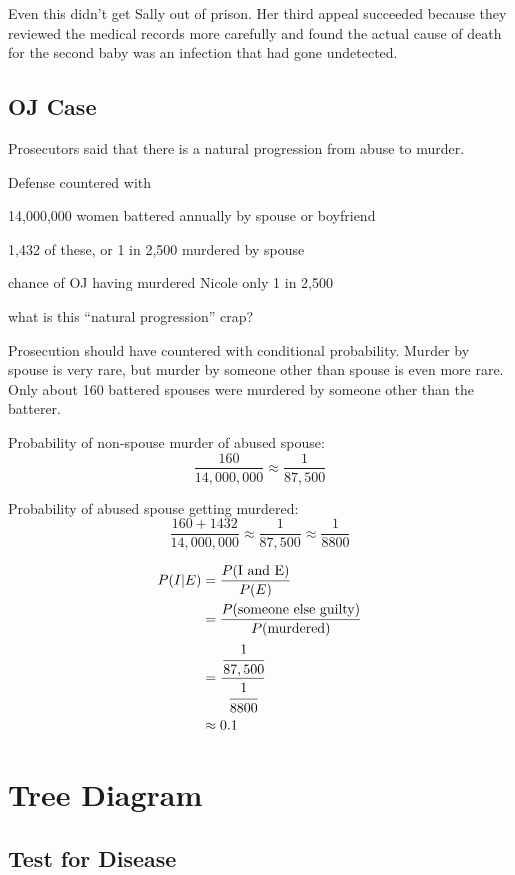 \documentclass[landscape]{exam}
\begin{document}
  Even this didn't get Sally out of prison. Her third appeal succeeded because
  they reviewed the medical records more carefully and found the actual cause of
  death for the second baby was an infection that had gone undetected.

  \subsection{OJ Case}
  Prosecutors said that there is a natural progression from abuse to murder.

  Defense countered with 
  \begin{itemize*}
    \item 14,000,000 women battered annually by spouse or boyfriend
    \item 1,432 of these, or 1 in 2,500 murdered by spouse
    \item chance of OJ having murdered Nicole only 1 in 2,500
    \item what is this ``natural progression'' crap?
  \end{itemize*}

  Prosecution should have countered with conditional probability. Murder by
  spouse is very rare, but murder by someone other than spouse is even more
  rare. Only about 160 battered spouses were murdered by someone other than
  the batterer.

  Probability of non-spouse murder of abused spouse:
  \[
    \frac{160}{14,000,000} \approx \frac{1}{87,500}
  \]

  Probability of abused spouse getting murdered:
  \[
    \frac{160 + 1432}{14,000,000} \approx \frac{1}{87,500} 
      \approx \frac{1}{8800}
  \]

  \begin{align*}
    P(I | E) & = \frac{P(\text{I and E})}{P(E)} \\
             & = \frac{P(\text{someone else guilty})}{P(\text{murdered})} \\
             & = \frac{\cfrac{1}{87,500}}{\cfrac{1}{8800}} \\
             & \approx 0.1 \\
  \end{align*}
  




  \section{Tree Diagram}
  \subsection{Test for Disease}
\end{document}
